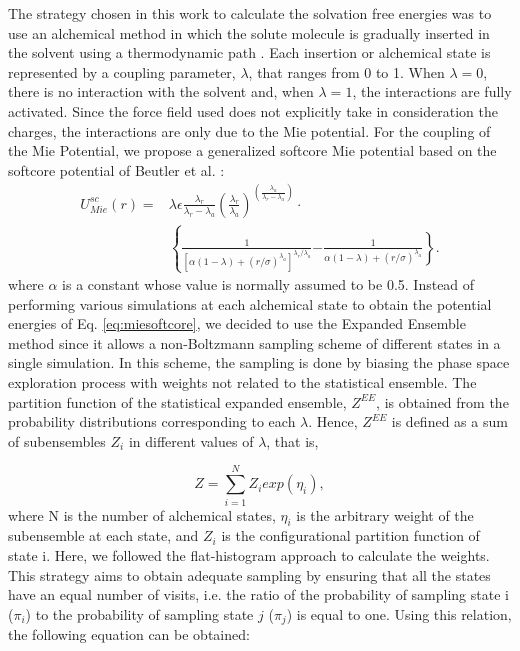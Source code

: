 \documentclass[final,12p,times,twocolumn]{elsarticle}
\begin{document}
	The strategy chosen in this work to calculate the solvation free energies  was to use an alchemical method in which the solute molecule is gradually inserted in the solvent using a  thermodynamic path \cite{klimovich}. Each insertion or alchemical state is represented by a coupling parameter, $\lambda$, that ranges from 0 to 1. When $\lambda=0$, there is no interaction with the solvent and, when $\lambda=1$, the interactions are fully activated. Since the force field used does not explicitly take in consideration  the charges, the interactions are only due to the Mie potential. For the coupling of the Mie Potential, we propose a generalized softcore Mie potential based on the softcore potential of Beutler et al.  \cite{beutler} :
	\begin{equation}
	\label{eq:miesoftcore}
	\begin{aligned}
	U_{Mie}^{sc}(r) {}=& \lambda\epsilon\frac{\lambda_r}{\lambda_r - \lambda_a} \left(\frac{\lambda_r}{\lambda_a} \right)^{\left( \frac{\lambda_a}{\lambda_r - \lambda_a} \right)} \cdot \\ 
	&  \left\lbrace\frac{1}{\left[\alpha(1-\lambda)+ (r/\sigma)^{\lambda_a}\right]^{\lambda_{r}/\lambda_{a}}}  \mathrm -  \right. \left. \frac{1}{\alpha(1-\lambda)+(r/\sigma)^{\lambda_a}}\right\rbrace .
	\end{aligned}
	\end{equation}
	where $\alpha$ is a constant whose value is  normally assumed to be 0.5. Instead of performing various simulations at each alchemical state to obtain the potential energies of Eq. \ref{eq:miesoftcore}, we decided to use the Expanded Ensemble method \cite{lyubartsev} since it allows a non-Boltzmann sampling scheme of different states in a single simulation. In this scheme, the sampling is done by biasing the phase space exploration process with weights not related to the statistical ensemble. The partition function of the statistical expanded ensemble, $Z^{EE}$, is obtained from the probability distributions corresponding to each $\lambda$. Hence, $Z^{EE}$ is defined as a sum of subensembles $Z_{i}$ in different values of $\lambda$, that is,
	
	\begin{equation}
	Z = \sum_{i=1}^{N} Z_{i} exp(\eta_{i}),
	\label{ee}
	\end{equation}   
	where N is the number of alchemical states, $\eta_{i}$ is the arbitrary weight of the subensemble at each state, and $Z_{i}$ is the configurational partition function of state i. Here, we followed the flat-histogram approach \cite{bernd1992,bernd1993,dayal2004} to calculate the weights. This strategy aims to obtain adequate sampling by ensuring that all the states have an equal number of visits, i.e. the ratio of the probability of sampling state i ($\pi_{i}$) to the probability of sampling state $j$ ($\pi_{j}$) is equal to one. Using this relation, the following equation can be obtained:
	
\end{document}
